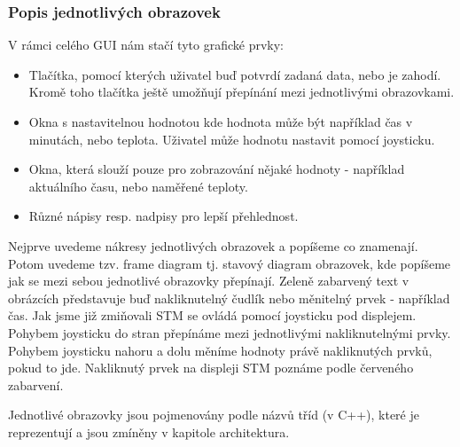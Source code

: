 \subsubsection{Popis jednotlivých obrazovek}

V rámci celého GUI nám stačí tyto grafické prvky:
\begin{itemize}
  \item Tlačítka, pomocí kterých uživatel buď potvrdí zadaná data, nebo je zahodí.
    Kromě toho tlačítka ještě umožňují přepínání mezi jednotlivými obrazovkami.
  \item Okna s nastavitelnou hodnotou kde hodnota může být například čas v minutách, nebo teplota.
    Uživatel může hodnotu nastavit pomocí joysticku.
  \item Okna, která slouží pouze pro zobrazování nějaké hodnoty - například aktuálního času, nebo
    naměřené teploty.
  \item Různé nápisy resp. nadpisy pro lepší přehlednost.
\end{itemize}

Nejprve uvedeme nákresy jednotlivých obrazovek a popíšeme co znamenají.
Potom uvedeme tzv. frame diagram tj. stavový diagram obrazovek, kde popíšeme jak se mezi sebou
jednotlivé obrazovky přepínají.
Zeleně zabarvený text v obrázcích představuje buď nakliknutelný čudlík nebo měnitelný prvek - například čas.
Jak jsme již zmiňovali STM se ovládá pomocí joysticku pod displejem.
Pohybem joysticku do stran přepínáme mezi jednotlivými nakliknutelnými prvky.
Pohybem joysticku nahoru a dolu měníme hodnoty právě nakliknutých prvků, pokud to jde.
Nakliknutý prvek na displeji STM poznáme podle červeného zabarvení.

Jednotlivé obrazovky jsou pojmenovány podle názvů tříd (v C++), které je reprezentují a jsou zmíněny
v kapitole architektura.

